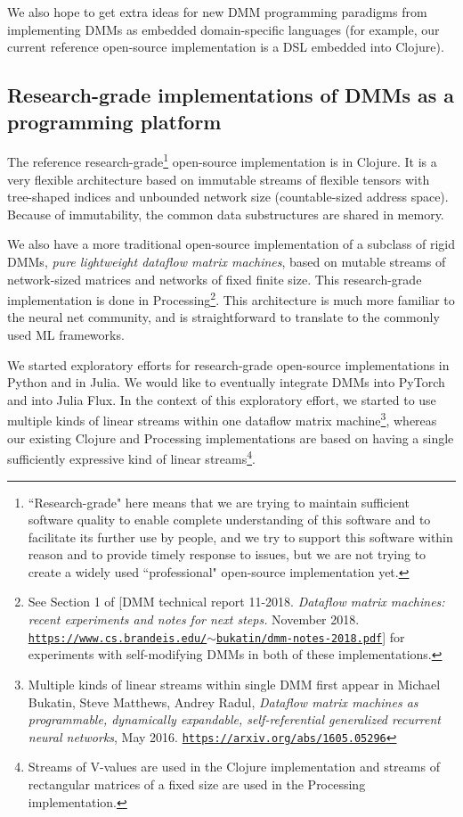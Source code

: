 \documentclass{article}
\begin{document}
We also hope to get extra ideas for new DMM programming paradigms from implementing
DMMs as embedded domain-specific
languages (for example, our current reference open-source implementation is a DSL embedded into Clojure).

\subsection{Research-grade implementations of DMMs as a programming platform}

The reference research-grade\footnote{``Research-grade" here
means that we are trying to maintain sufficient software quality to enable complete understanding of this software
and to facilitate its further use by people, and we try to support this software within reason and to provide
timely response to issues, but we are not trying to create a widely used ``professional" 
open-source implementation yet.} open-source implementation is in Clojure. It is a very flexible architecture based
on immutable streams of flexible tensors with tree-shaped indices and unbounded network size
(countable-sized address space). Because of immutability, the common data substructures are shared in memory.

We also have a more traditional open-source implementation of a subclass of rigid DMMs, {\em pure lightweight dataflow matrix machines},
based on mutable streams of network-sized matrices and networks of fixed finite size. 
This research-grade implementation is done in Processing\footnote{See
Section 1 of [DMM technical report 11-2018. {\em Dataflow matrix machines: recent experiments and notes for next steps.} November 2018. \href{https://www.cs.brandeis.edu/~bukatin/dmm-notes-2018.pdf}
{\tt https://www.cs.brandeis.edu/$\sim$bukatin/dmm-notes-2018.pdf}]  
for experiments with self-modifying DMMs in both of these implementations.}. This architecture is much more
familiar to the neural net community, and is straightforward to translate to the commonly used ML frameworks.

We started exploratory efforts for research-grade open-source implementations in Python and in Julia. We
would like to eventually integrate DMMs into PyTorch and into Julia Flux. In the context of this exploratory effort,
we started to use multiple kinds of linear streams within one dataflow matrix machine\footnote{Multiple kinds 
of linear streams within single DMM first appear in Michael Bukatin, Steve Matthews, Andrey Radul,
{\em Dataflow matrix machines as programmable, dynamically expandable, self-referential 
generalized recurrent neural networks}, May 2016.
\href{https://arxiv.org/abs/1605.05296}{\tt https://arxiv.org/abs/1605.05296}}, 
whereas our existing Clojure and Processing implementations are based on having
a single sufficiently expressive kind of linear streams\footnote{Streams of V-values are used in the Clojure implementation
and streams of rectangular matrices of a fixed size are used in the Processing implementation.}.
\end{document}
